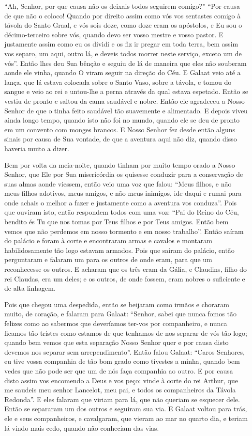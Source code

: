 “Ah, Senhor, por que causa não os deixais todos seguirem comigo?” “Por causa de
que não o coloco! Quando por direito assim como vós vos sentastes comigo à
távola do Santo Graal, e vós sois doze, como doze eram os apóstolos, e Eu sou o
décimo-terceiro sobre vós, quando devo ser vosso mestre e vosso pastor. E
justamente assim como eu os dividi e os fiz ir pregar em toda terra, bem assim
vos separo, um aqui, outro lá, e deveis todos morrer neste serviço, exceto um
de vós”. Então lhes deu Sua bênção e seguiu de lá de maneira que eles não
souberam aonde ele vinha, quando O viram seguir na direção do Céu. E Galaat 
veio até a lança, que lá estava colocada sobre o Santo Vaso,
sobre a távola, e tomou do sangue e veio ao rei e untou-lhe a perna através da
qual estava espetado. Então se vestiu de pronto e saltou da cama saudável e
nobre. Então ele agradeceu a Nosso Senhor de que o tinha feito saudável tão
suavemente e alimentado. E depois viveu ainda longo tempo, quando isto não foi
no mundo, quando ele se deu de pronto em um convento com monges brancos. E
Nosso Senhor fez desde então alguns sinais por causa de Sua vontade, de que a
aventura aqui não diz, quando disso haveria muito a dizer. 

Bem por volta da meia-noite, quando tinham por muito tempo orado a Nosso Senhor,
que Ele por Sua misericórdia os quisesse conduzir para a conservação de suas
almas aonde viessem, então veio uma voz que falou: “Meus filhos, e não meus
filhos adotivos, meus amigos, e não meus inimigos, ide daqui e rumai para onde
achais o melhor a fazer e justamente como a aventura vos conduza”.
Pois que ouviram isto, então respondem todos com uma voz: “Pai do Reino do Céu,
bendito és Tu que nos tomas por Teus filhos e por Teus amigos. Então bem vemos
que não perdemos em nosso tormento e em nosso trabalho”. Então saíram do
palácio e foram à corte e encontraram armas e cavalos e montaram
habilidosamente tão logo estavam armados. Pois que saíram do palácio, então
perguntaram e falaram um para os outros de onde eram, para que um reconhecesse
os outros. E acharam que os três eram da Gália, e Claudins, filho do rei
Claudas, era um deles; e os outros, de onde fossem, eram nobres o suficiente e
de alta linhagem.

Pois que chegou uma despedida, então se beijaram como irmãos e choraram muito,
de coração, e falaram para Galaat: “Senhor, sabei que nunca fomos tão felizes
como ao sabermos que deveríamos ter-vos por companheiro, e nunca ficamos tão
tristes como estamos de que tenhamos de nos separar de vós tão logo; quando bem
vemos que esta separação Nosso Senhor quer e por causa disto devemos nos
separar sem arrependimento”. Então falou Galaat: “Caros Senhores, eu tive
vossa companhia de tão bom grado como tivestes a minha, quando bem vedes que
não pode ser que um de nós faça companhia ao outro. E por causa disto assim vos
encomendo a Deus e vos peço: vinde à corte do rei Arthur, que me saudeis meu
senhor Lancelot, meu pai, e todos os companheiros da Távola Redonda”. E eles
falaram que viriam para lá, que não queriam se esquecer dele. Então se
separaram um dos outros e seguiram sua via. E Galaat voltou para trás, ele e
seus companheiros, e cavalgaram, que vieram ao mar no quarto dia, e teriam lá
vindo mais cedo, quando não conheciam das vias.

